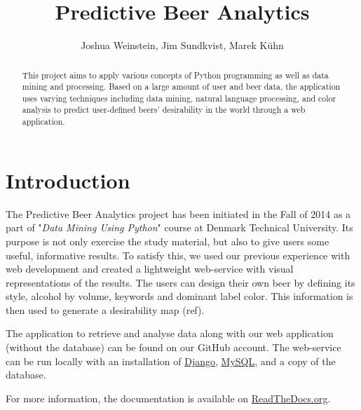 \documentclass[10pt]{IEEEtran}
\title{Predictive Beer Analytics}
\author{Joshua Weinstein, Jim Sundkvist, Marek Kühn}
\begin{document}
\maketitle

\begin{abstract}
This project aims to apply various concepts of Python programming as well as data mining and processing.
Based on a large amount of user and beer data, the application uses varying techniques including data mining, natural language processing, and color analysis to predict user-defined beers' desirability in the world through a web application. 
\end{abstract}

\section{Introduction}

The Predictive Beer Analytics project has been initiated in the Fall of 2014 as a part of "\textit{Data Mining Using Python}" course at Denmark Technical University. Its purpose is not only exercise the study material, but also to give users some useful, informative results. To satisfy this, we used our previous experience with web development and created a lightweight web-service with visual representations of the results. The users can design their own beer by defining its style, alcohol by volume, keywords and dominant label color. This information is then used to generate a desirability map (ref).

The application to retrieve and analyse data along with our web application (without the database) can be found on our GitHub account. The web-service can be run locally with an installation of \href{https://www.djangoproject.com/}{Django}, \href{http://www.mysql.com/}{MySQL}, and a copy of the database.

For more information, the documentation is available on \href{http://predictive-beer-analytics.readthedocs.org/en/latest/}{ReadTheDocs.org}. 
\end{document}
